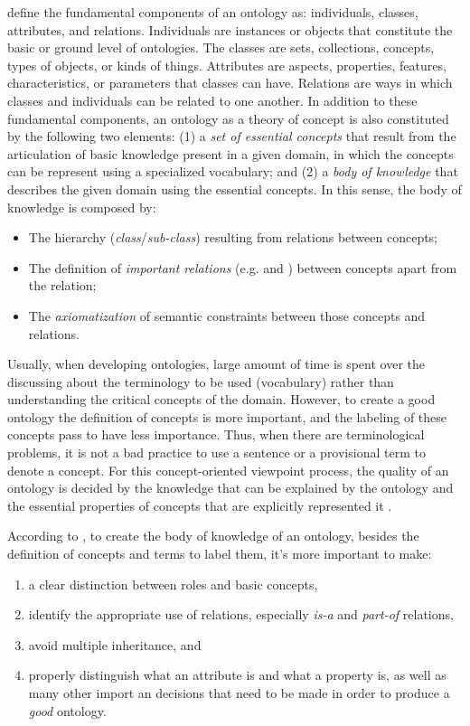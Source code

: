  define the fundamental components of an ontology as: individuals, classes, attributes, and relations. Individuals are instances or objects that constitute the basic or ground level of ontologies. The classes are sets, collections, concepts, types of objects, or kinds of things. Attributes are aspects, properties, features, characteristics, or parameters that classes can have. Relations are ways in which classes and individuals can be related to one another. In addition to these fundamental components, an ontology as a theory of concept \cite{Mizoguchi2004} is also constituted by the following two elements: (1) a \emph{set of essential concepts} that result from the articulation of basic knowledge present in a given domain, in which the concepts can be represent using a specialized vocabulary; and
(2) a \emph{body of knowledge} that describes the given domain using the essential concepts. In this sense, the body of knowledge is composed by:
\begin{itemize}
\item The hierarchy (\emph{class}/\emph{sub-class}) resulting from  relations between concepts;
\item The definition of \emph{important relations} (e.g.  and ) between concepts apart from the  relation;
\item The \emph{axiomatization} of semantic constraints between those concepts and relations.
\end{itemize}

Usually, when developing ontologies, large amount of time is spent over the discussing about the terminology to be used (vocabulary) rather than understanding the critical concepts of the domain. However, to create a good ontology the definition of concepts is more important, and the labeling of these concepts pass to have less importance. Thus, when there are terminological problems, it is not a bad practice to use a sentence or a provisional term to denote a concept. For this concept-oriented viewpoint process, the quality of an ontology is decided by the knowledge that can be explained by the ontology and the essential properties of concepts that are explicitly represented it \cite{Mizoguchi2004}.

According to , to create the body of knowledge of an ontology, besides the definition of concepts and terms to label them, it's more important to make: 
\begin{enumerate}%
\item a clear distinction between roles and basic concepts,
\item identify the appropriate use of relations, especially \emph{is-a} and \emph{part-of} relations,
\item avoid multiple inheritance, and
\item properly distinguish what an attribute is and what a property is, as well as many other import an decisions that need to be made in order to produce a \emph{good} ontology.
\end{enumerate}

